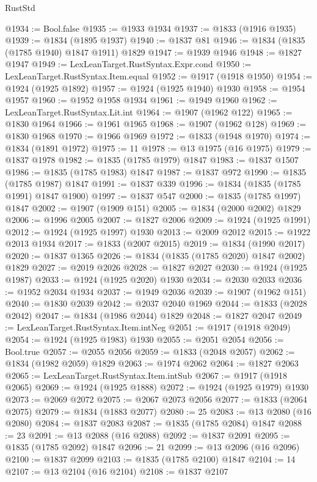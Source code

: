 \begin{lexlean}{RustStd}
\begin{coremodule}
@1934 := Bool.false
@1935 := @1933 @1934
@1937 := @1833 (@1916 @1935)
@1939 := @1834 (@1895 @1937)
@1940 := @1837 @81
@1946 := @1834 (@1835 (@1785 @1940) @1847 @1911) @1829
@1947 := @1939 @1946
@1948 := @1827 @1947
@1949 := LexLeanTarget.RustSyntax.Expr.cond
@1950 := LexLeanTarget.RustSyntax.Item.equal
@1952 := @1917 (@1918 @1950)
@1954 := @1924 (@1925 @1892)
@1957 := @1924 (@1925 @1940) @1930
@1958 := @1954 @1957
@1960 := @1952 @1958 @1934
@1961 := @1949 @1960
@1962 := LexLeanTarget.RustSyntax.Lit.int
@1964 := @1907 (@1962 @122)
@1965 := @1830 @1964
@1966 := @1961 @1965
@1968 := @1907 (@1962 @128)
@1969 := @1830 @1968
@1970 := @1966 @1969
@1972 := @1833 (@1948 @1970)
@1974 := @1834 (@1891 @1972)
@1975 := 11
@1978 := @13 @1975 (@16 @1975)
@1979 := @1837 @1978
@1982 := @1835 (@1785 @1979) @1847
@1983 := @1837 @1507
@1986 := @1835 (@1785 @1983) @1847
@1987 := @1837 @972
@1990 := @1835 (@1785 @1987) @1847
@1991 := @1837 @339
@1996 := @1834 (@1835 (@1785 @1991) @1847 @1900)
@1997 := @1837 @547
@2000 := @1835 (@1785 @1997) @1847
@2002 := @1907 (@1909 @151)
@2005 := @1834 (@2000 @2002) @1829
@2006 := @1996 @2005
@2007 := @1827 @2006
@2009 := @1924 (@1925 @1991)
@2012 := @1924 (@1925 @1997) @1930
@2013 := @2009 @2012
@2015 := @1922 @2013 @1934
@2017 := @1833 (@2007 @2015)
@2019 := @1834 (@1990 @2017)
@2020 := @1837 @1365
@2026 := @1834 (@1835 (@1785 @2020) @1847 @2002) @1829
@2027 := @2019 @2026
@2028 := @1827 @2027
@2030 := @1924 (@1925 @1987)
@2033 := @1924 (@1925 @2020) @1930
@2034 := @2030 @2033
@2036 := @1952 @2034 @1934
@2037 := @1949 @2036
@2039 := @1907 (@1962 @151)
@2040 := @1830 @2039
@2042 := @2037 @2040 @1969
@2044 := @1833 (@2028 @2042)
@2047 := @1834 (@1986 @2044) @1829
@2048 := @1827 @2047
@2049 := LexLeanTarget.RustSyntax.Item.intNeg
@2051 := @1917 (@1918 @2049)
@2054 := @1924 (@1925 @1983) @1930
@2055 := @2051 @2054
@2056 := Bool.true
@2057 := @2055 @2056
@2059 := @1833 (@2048 @2057)
@2062 := @1834 (@1982 @2059) @1829
@2063 := @1974 @2062
@2064 := @1827 @2063
@2065 := LexLeanTarget.RustSyntax.Item.intSub
@2067 := @1917 (@1918 @2065)
@2069 := @1924 (@1925 @1888)
@2072 := @1924 (@1925 @1979) @1930
@2073 := @2069 @2072
@2075 := @2067 @2073 @2056
@2077 := @1833 (@2064 @2075)
@2079 := @1834 (@1883 @2077)
@2080 := 25
@2083 := @13 @2080 (@16 @2080)
@2084 := @1837 @2083
@2087 := @1835 (@1785 @2084) @1847
@2088 := 23
@2091 := @13 @2088 (@16 @2088)
@2092 := @1837 @2091
@2095 := @1835 (@1785 @2092) @1847
@2096 := 21
@2099 := @13 @2096 (@16 @2096)
@2100 := @1837 @2099
@2103 := @1835 (@1785 @2100) @1847
@2104 := 14
@2107 := @13 @2104 (@16 @2104)
@2108 := @1837 @2107

\end{coremodule}
\end{lexlean}

